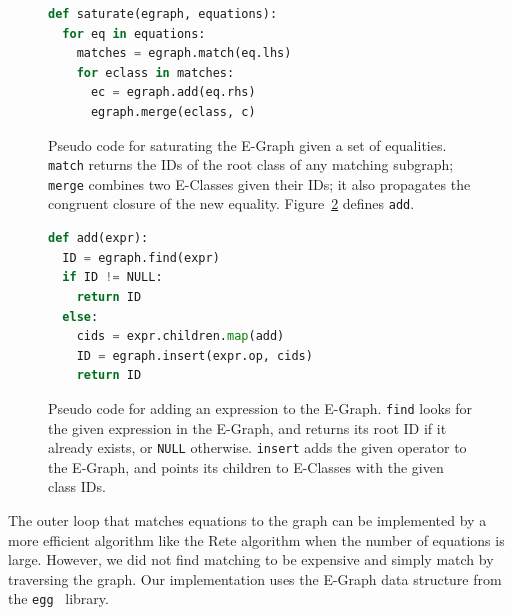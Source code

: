 \begin{figure}
\centering
\begin{minipage}{0.5\textwidth}
\begin{lstlisting}[language=Python]
def saturate(egraph, equations):
  for eq in equations: 
    matches = egraph.match(eq.lhs)
    for eclass in matches: 
      ec = egraph.add(eq.rhs)
      egraph.merge(eclass, c)
\end{lstlisting}
\end{minipage}
    \caption{Pseudo code for saturating the E-Graph given a set of equalities.
      \texttt{match} returns the IDs of the root class of any matching subgraph;
      \texttt{merge} combines two E-Classes given their IDs; it also propagates
      the congruent closure of the new equality.
      Figure~\ref{fig:egraphadd} defines \texttt{add}.}
    \label{eqsat}
\end{figure}
\begin{figure}
\centering
\begin{minipage}{0.5\textwidth}
\begin{lstlisting}[language=Python]
def add(expr):
  ID = egraph.find(expr)
  if ID != NULL:
    return ID
  else:
    cids = expr.children.map(add)
    ID = egraph.insert(expr.op, cids)
    return ID
\end{lstlisting}
\end{minipage}
    \caption{Pseudo code for adding an expression to the E-Graph. \texttt{find}
      looks for the given expression in the E-Graph, and returns its root ID if
      it already exists, or \texttt{NULL} otherwise. \texttt{insert} adds the
      given operator to the E-Graph, and points its children to E-Classes with the
      given class IDs. }
    \label{fig:egraphadd}
\end{figure}

The outer loop that matches equations to the graph can be implemented by a more
efficient algorithm like the Rete algorithm \cite{DBLP:journals/ai/Forgy82} when
the number of equations is large. However, we did not find matching to be
expensive and simply match by traversing the graph. Our implementation uses the
E-Graph data structure from the \texttt{egg}~\cite{EGG} library. 

